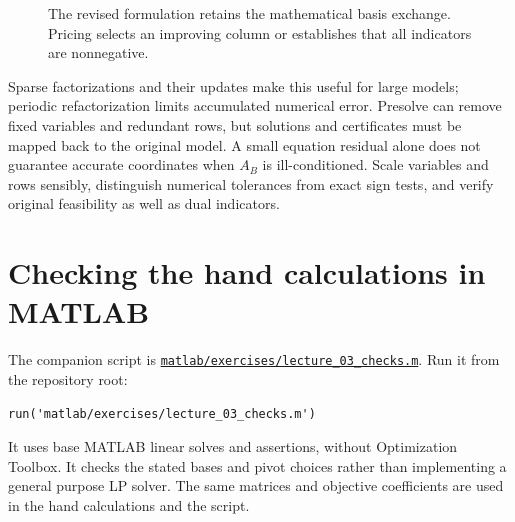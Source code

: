 \documentclass[11pt,a4paper]{article}
\begin{document}
\begin{figure}[H]
  \centering
  \caption{The revised formulation retains the mathematical basis exchange.
    Pricing selects an improving column or establishes that all indicators
    are nonnegative.}\label{fig:revised-simplex}
\end{figure}
Sparse factorizations and their updates make this useful for large models;
periodic refactorization limits accumulated numerical error. Presolve can
remove fixed variables and redundant rows, but solutions and certificates must
be mapped back to the original model. A small equation residual alone does not
guarantee accurate coordinates when $A_B$ is ill-conditioned.
Scale variables and rows sensibly, distinguish numerical tolerances from exact
sign tests, and verify original feasibility as well as dual indicators.

\section{Checking the hand calculations in MATLAB}\label{sec:matlab}
The companion script is
\href{../../matlab/exercises/lecture_03_checks.m}{\texttt{matlab/exercises/lecture\_03\_checks.m}}.
Run it from the repository root:
\begin{lstlisting}
run('matlab/exercises/lecture_03_checks.m')
\end{lstlisting}
It uses base MATLAB linear solves and assertions, without Optimization Toolbox.
It checks the stated bases and pivot choices rather than implementing a general
purpose LP solver. The same matrices and objective coefficients are used in the
hand calculations and the script.
\end{document}
